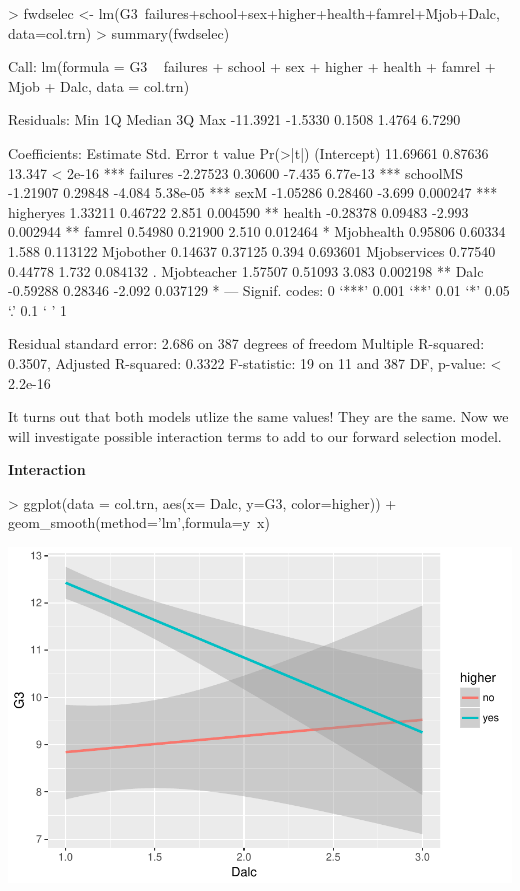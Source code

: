 \documentclass{article}
\begin{document}
\begin{Schunk}
\begin{Sinput}
> fwdselec <- lm(G3~failures+school+sex+higher+health+famrel+Mjob+Dalc, data=col.trn)
> summary(fwdselec)
\end{Sinput}
\begin{Soutput}
Call:
lm(formula = G3 ~ failures + school + sex + higher + health + 
    famrel + Mjob + Dalc, data = col.trn)

Residuals:
     Min       1Q   Median       3Q      Max 
-11.3921  -1.5330   0.1508   1.4764   6.7290 

Coefficients:
             Estimate Std. Error t value Pr(>|t|)    
(Intercept)  11.69661    0.87636  13.347  < 2e-16 ***
failures     -2.27523    0.30600  -7.435 6.77e-13 ***
schoolMS     -1.21907    0.29848  -4.084 5.38e-05 ***
sexM         -1.05286    0.28460  -3.699 0.000247 ***
higheryes     1.33211    0.46722   2.851 0.004590 ** 
health       -0.28378    0.09483  -2.993 0.002944 ** 
famrel        0.54980    0.21900   2.510 0.012464 *  
Mjobhealth    0.95806    0.60334   1.588 0.113122    
Mjobother     0.14637    0.37125   0.394 0.693601    
Mjobservices  0.77540    0.44778   1.732 0.084132 .  
Mjobteacher   1.57507    0.51093   3.083 0.002198 ** 
Dalc         -0.59288    0.28346  -2.092 0.037129 *  
---
Signif. codes:  0 ‘***’ 0.001 ‘**’ 0.01 ‘*’ 0.05 ‘.’ 0.1 ‘ ’ 1

Residual standard error: 2.686 on 387 degrees of freedom
Multiple R-squared:  0.3507,	Adjusted R-squared:  0.3322 
F-statistic:    19 on 11 and 387 DF,  p-value: < 2.2e-16
\end{Soutput}
\end{Schunk}

It turns out that both models utlize the same values! They are the same. Now we will investigate possible interaction terms to add to our forward selection model.

\textbf{Interaction}

\begin{Schunk}
\begin{Sinput}
> ggplot(data = col.trn, aes(x= Dalc, y=G3, color=higher)) + geom_smooth(method='lm',formula=y~x)
\end{Sinput}
\end{Schunk}
\includegraphics{Report_3-016}
\end{document}
